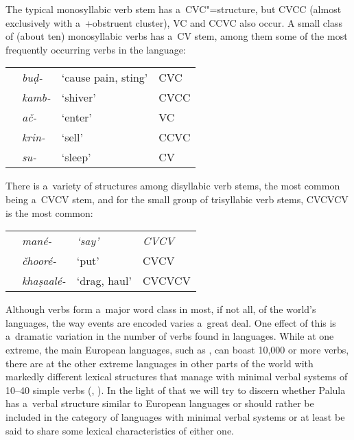 The typical monosyllabic verb stem has a~CVC"=structure, but CVCC (almost exclusively with a~+obstruent cluster), VC and CCVC also occur. A small class of (about ten) monosyllabic verbs has a~CV stem, among them some of the most frequently occurring verbs in the language:

\begin{table}[H]
\begin{tabularx}{\textwidth}{ l l l l }
&
\textit{buḍ-} &
`cause pain, sting' &
CVC\\
&
\textit{kamb-} &
`shiver' &
CVCC\\
&
\textit{ač-} &
`enter' &
VC\\
&
\textit{krin-} &
`sell' &
CCVC\\
&
\textit{su-} &
`sleep' &
CV\\
\end{tabularx}
\end{table}

There is a~variety of structures among disyllabic verb stems, the most common being a~CVCV stem, and for the small group of trisyllabic verb stems, CVCVCV is the most common:

\begin{table}[H]
\begin{tabularx}{\textwidth}{ l l l l }
&
\textit{mané-} &
\textit{\textup{`say'}} &
\textit{\textup{CVCV}} \\
&
\textit{čhooré-} &
`put' &
CVCV\\
&
\textit{khaṣaalé-} &
`drag, haul' &
CVCVCV\\
\end{tabularx}
\end{table}

Although verbs form a~major word class in most, if not all, of the world's languages, the way events are encoded varies a~great deal. One effect of this is a~dramatic variation in the number of verbs found in languages. While at one extreme, the main European languages, such as , can boast 10,000 or more verbs, there are at the other extreme languages in other parts of the world with markedly different lexical structures that manage with minimal verbal systems of 10--40 simple verbs (\citealt[347--348]{viberg1993}, \citeyear[409]{viberg2006}). In the light of that we will try to discern whether Palula has a~verbal structure similar to European languages or should rather be included in the category of languages with minimal verbal systems or at least be said to share some lexical characteristics of either one.



